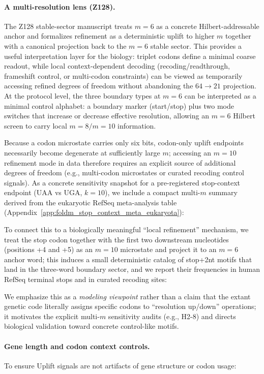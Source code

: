 \paragraph{A multi-resolution lens (Z128).}
The Z128 stable-sector manuscript \cite{Ma2025Z128SM} treats $m=6$ as a concrete Hilbert-addressable anchor and formalizes refinement as a deterministic uplift to higher $m$ together with a canonical projection back to the $m=6$ stable sector.
This provides a useful interpretation layer for the biology: triplet codons define a minimal coarse readout, while local context-dependent decoding (recoding/readthrough, frameshift control, or multi-codon constraints) can be viewed as temporarily accessing refined degrees of freedom without abandoning the $64\to 21$ projection.
At the protocol level, the three boundary types at $m=6$ can be interpreted as a minimal control alphabet: a boundary marker (start/stop) plus two mode switches that increase or decrease effective resolution, allowing an $m=6$ Hilbert screen to carry local $m=8/m=10$ information.

Because a codon microstate carries only six bits, codon-only uplift endpoints necessarily become degenerate at sufficiently large $m$; accessing an $m=10$ refinement mode in data therefore requires an explicit source of additional degrees of freedom (e.g., multi-codon microstates or curated recoding control signals).
As a concrete sensitivity snapshot for a pre-registered stop-context endpoint (UAA vs UGA, $k=10$), we include a compact multi-$m$ summary derived from the eukaryotic RefSeq meta-analysis table (Appendix~\ref{app:foldm_stop_context_meta_eukaryota}):

To connect this to a biologically meaningful ``local refinement'' mechanism, we treat the stop codon together with the first two downstream nucleotides (positions +4 and +5) as an $m=10$ microstate and project it to an $m=6$ anchor word; this induces a small deterministic catalog of stop+2nt motifs that land in the three-word boundary sector, and we report their frequencies in human RefSeq terminal stops and in curated recoding sites:

We emphasize this as a \emph{modeling viewpoint} rather than a claim that the extant genetic code literally assigns specific codons to ``resolution up/down'' operations; it motivates the explicit multi-$m$ sensitivity audits (e.g., H2-8) and directs biological validation toward concrete control-like motifs.

\paragraph{Gene length and codon context controls.}
To ensure Uplift signals are not artifacts of gene structure or codon usage:







